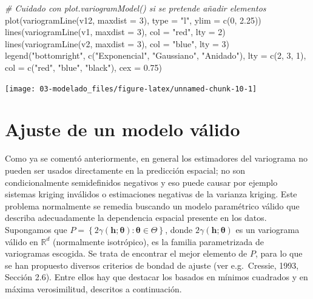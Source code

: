 \documentclass[
  spanish,
]{book}
\newenvironment{Shaded}{\begin{snugshade}}{\end{snugshade}}
\newcommand{\AttributeTok}[1]{\textcolor[rgb]{0.77,0.63,0.00}{#1}}
\newcommand{\CommentTok}[1]{\textcolor[rgb]{0.56,0.35,0.01}{\textit{#1}}}
\newcommand{\DecValTok}[1]{\textcolor[rgb]{0.00,0.00,0.81}{#1}}
\newcommand{\FloatTok}[1]{\textcolor[rgb]{0.00,0.00,0.81}{#1}}
\newcommand{\FunctionTok}[1]{\textcolor[rgb]{0.00,0.00,0.00}{#1}}
\newcommand{\NormalTok}[1]{#1}
\newcommand{\StringTok}[1]{\textcolor[rgb]{0.31,0.60,0.02}{#1}}
\theoremstyle{break}
\theoremstyle{definition}
\theoremstyle{definition}
\theoremstyle{definition}
\theoremstyle{definition}
\theoremstyle{remark}
\begin{document}
\begin{Shaded}
\begin{Highlighting}[]
\CommentTok{\# Cuidado con plot.variogramModel() si se pretende añadir elementos}
\FunctionTok{plot}\NormalTok{(}\FunctionTok{variogramLine}\NormalTok{(v12, }\AttributeTok{maxdist =} \DecValTok{3}\NormalTok{), }\AttributeTok{type =} \StringTok{"l"}\NormalTok{, }\AttributeTok{ylim =} \FunctionTok{c}\NormalTok{(}\DecValTok{0}\NormalTok{, }\FloatTok{2.25}\NormalTok{))}
\FunctionTok{lines}\NormalTok{(}\FunctionTok{variogramLine}\NormalTok{(v1, }\AttributeTok{maxdist =} \DecValTok{3}\NormalTok{), }\AttributeTok{col =} \StringTok{"red"}\NormalTok{, }\AttributeTok{lty =} \DecValTok{2}\NormalTok{)}
\FunctionTok{lines}\NormalTok{(}\FunctionTok{variogramLine}\NormalTok{(v2, }\AttributeTok{maxdist =} \DecValTok{3}\NormalTok{), }\AttributeTok{col =} \StringTok{"blue"}\NormalTok{, }\AttributeTok{lty =} \DecValTok{3}\NormalTok{)}
\FunctionTok{legend}\NormalTok{(}\StringTok{"bottomright"}\NormalTok{, }\FunctionTok{c}\NormalTok{(}\StringTok{"Exponencial"}\NormalTok{, }\StringTok{"Gaussiano"}\NormalTok{, }\StringTok{"Anidado"}\NormalTok{), }\AttributeTok{lty =} \FunctionTok{c}\NormalTok{(}\DecValTok{2}\NormalTok{, }\DecValTok{3}\NormalTok{, }\DecValTok{1}\NormalTok{), }
       \AttributeTok{col =} \FunctionTok{c}\NormalTok{(}\StringTok{"red"}\NormalTok{, }\StringTok{"blue"}\NormalTok{, }\StringTok{"black"}\NormalTok{), }\AttributeTok{cex =} \FloatTok{0.75}\NormalTok{)}
\end{Highlighting}
\end{Shaded}

\begin{center}\texttt{[image: 03-modelado\_files/figure-latex/unnamed-chunk-10-1]} \end{center}

\hypertarget{ajuste-variog}{%
\section{Ajuste de un modelo válido}\label{ajuste-variog}}

Como ya se comentó anteriormente, en general los estimadores del variograma no pueden ser usados directamente en la predicción espacial;
no son condicionalmente semidefinidos negativos y eso puede causar por ejemplo sistemas kriging inválidos o estimaciones negativas de la varianza kriging.
Este problema normalmente se remedia buscando un modelo paramétrico válido que describa adecuadamente la dependencia espacial presente en los datos.
Supongamos que \(P=\left\{ 2\gamma(\mathbf{h};\boldsymbol{\theta}):\boldsymbol{\theta}\in \Theta \right\}\), donde \(2\gamma(\mathbf{h};\boldsymbol{\theta})\) es un variograma válido en \(\mathbb{R}^{d}\) (normalmente isotrópico), es la familia parametrizada de variogramas escogida.
Se trata de encontrar el mejor elemento de \(P\), para lo que se han propuesto diversos criterios de bondad de ajuste (ver e.g.~Cressie, 1993, Sección 2.6).
Entre ellos hay que destacar los basados en mínimos cuadrados y en máxima verosimilitud, descritos a continuación.
\end{document}
